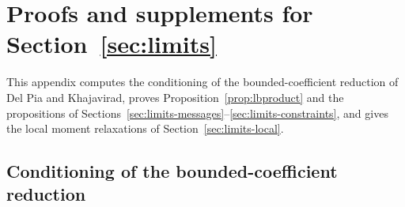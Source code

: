 \section{Proofs and supplements for Section~\ref{sec:limits}}\label{app:limits}

This appendix computes the conditioning of the bounded-coefficient reduction
of Del Pia and Khajavirad, proves Proposition~\ref{prop:lbproduct} and the
propositions of Sections~\ref{sec:limits-messages}--\ref{sec:limits-constraints},
and gives the local moment relaxations of Section~\ref{sec:limits-local}.

\subsection{Conditioning of the bounded-coefficient reduction}\label{app:dk}

